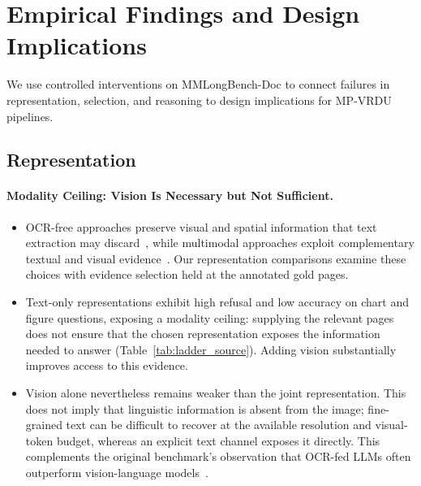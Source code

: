\section{Empirical Findings and Design Implications}
\label{sec:emp_findings}

We use controlled interventions on MMLongBench-Doc to connect failures in representation, selection, and reasoning to design implications for MP-VRDU pipelines.

\subsection{Representation}
\label{sec:findings_representation}

\paragraph{Modality Ceiling: Vision Is Necessary but Not Sufficient.}
\begin{itemize}
    \item OCR-free approaches preserve visual and spatial information that text extraction may discard~\citep{cho2024m3docrag,tanaka2025vdocrag}, while multimodal approaches exploit complementary textual and visual evidence~\citep{han2025mdocagent}. Our representation comparisons examine these choices with evidence selection held at the annotated gold pages.

    \item Text-only representations exhibit high refusal and low accuracy on chart and figure questions, exposing a modality ceiling: supplying the relevant pages does not ensure that the chosen representation exposes the information needed to answer (Table~\ref{tab:ladder_source}). Adding vision substantially improves access to this evidence.

    \item Vision alone nevertheless remains weaker than the joint representation. This does not imply that linguistic information is absent from the image; fine-grained text can be difficult to recover at the available resolution and visual-token budget, whereas an explicit text channel exposes it directly. This complements the original benchmark's observation that OCR-fed LLMs often outperform vision-language models~\citep{ma2024mmlongbench}.
\end{itemize}

